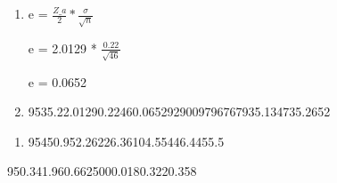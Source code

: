
\begin{question}
    
    \begin{enumerate}[label={\textbf{\alph*)}}]

        \item
              e = $\frac{Z\_a}{2} * \frac{\sigma}{\sqrt{n}}$ 
        
              e = 2.0129 * $\frac{0.22}{\sqrt{46}}$

              e = 0.0652

        \item  
              
              \begin{formula1}
                {95}{35.2}{2.0129}{0.22}{46}{0.06529290097967679}{35.1347}{35.2652}
              \end{formula1}

    \end{enumerate}
\end{question}


\begin{question}
    
    \begin{enumerate}[label={\textbf{\alph*)}}]

        \item  

            \begin{formula2}
                {95}{450.95}{2.2622}{6.36}{10}{4.55}{446.4}{455.5}
            \end{formula2}
    
    \end{enumerate}
\end{question}


\begin{question}

    \begin{formula3} 
        {95}{0.34}{1.96}{0.66}{2500}{0.018}{0.322}{0.358}
    \end{formula3}

\end{question}

